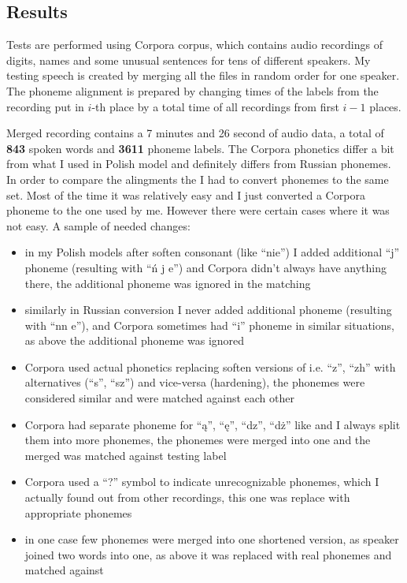 \documentclass[12pt,a4paper,english]{article}
\begin{document}
\newpage
\subsection{Results}

Tests are performed using Corpora corpus, which contains audio recordings of digits, names and some unusual sentences for tens of different speakers. \newline
My testing speech is created by merging all the files in random order for one speaker. The phoneme alignment is prepared by changing times of the labels from the recording put in $i$-th place by a total time of all recordings from first $i-1$ places. \newline

Merged recording contains a 7 minutes and 26 second of audio data, a total of \textbf{843} spoken words and \textbf{3611} phoneme labels. \newline
The Corpora phonetics differ a bit from what I used in Polish model and definitely differs from Russian phonemes. In order to compare the alingments the I had to convert phonemes to the same set. Most of the time it was relatively easy and I just converted a Corpora phoneme to the one used by me. However there were certain cases where it was not easy.\newline
A sample of needed changes: \newline
\begin{itemize}
    \item in my Polish models after soften consonant (like “nie”) I added additional “j” phoneme (resulting with “ń j e”) and Corpora didn't always have anything there, \newline
    the additional phoneme was ignored in the matching
    \item similarly in Russian conversion I never added additional phoneme (resulting with “nn e”), and Corpora sometimes had “i” phoneme in similar situations, \newline
    as above the additional phoneme was ignored
    \item Corpora used actual phonetics replacing soften versions of i.e. “z”, “zh” with alternatives (“s”, “sz”) and vice-versa (hardening), \newline
    the phonemes were considered similar and were matched against each other
    \item Corpora had separate phoneme for “ą”, “ę”, “dz”, “dż” like and I always split them into more phonemes, \newline
    the phonemes were merged into one and the merged was matched against testing label
    \item Corpora used a “?” symbol to indicate unrecognizable phonemes, which I actually found out from other recordings, \newline
    this one was replace with appropriate phonemes
    \item in one case few phonemes were merged into one shortened version, as speaker joined two words into one, \newline
    as above it was replaced with real phonemes and matched against
\newpage
\end{itemize}
\end{document}
